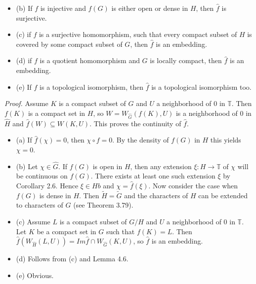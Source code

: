 \documentclass[12pt]{article}
\begin{document}
\begin{itemize}
\begin{itemize}
\begin{itemize}
    \item (b) If $f$ is injective and $f(G)$ is either open or dense in $H$, then $\hat{f}$ is surjective.

    \item (c) if $f$ is a surjective homomorphism, such that every compact subset of $H$ is covered by some compact subset
    of $G$, then $\hat{f}$ is an embedding.

    \item (d) if $f$ is a quotient homomorphism and $G$ is locally compact, then $\hat{f}$ is an embedding.

    \item (e) If $f$ is a topological isomorphism, then $\hat{f}$ is a topological isomorphism too.

\end{itemize}


\emph{Proof.} Assume $K$ is a compact subset of $G$ and $U$ a neighborhood of 0 in $\mathbb{T}$. Then $f(K)$ is a compact set in $H$,
so $W = W_{\hat{G}}(f(K), U)$ is a neighborhood of 0 in $\hat{H}$ and $\hat{f}(W) \subseteq W(K, U)$. This proves the continuity of $\hat{f}$.


\begin{itemize}

    \item (a) If $\hat{f}(\chi) = 0$, then $\chi \circ f = 0$. By the density of $f(G)$ in $H$ this yields $\chi = 0$.

    \item (b) Let $\chi \in \hat{G}$. If $f(G)$ is open in $H$, then any extension $\xi : H \to \mathbb{T}$ of $\chi$ will be continuous on $f(G)$. There
    exists at least one such extension $\xi$ by Corollary 2.6. Hence $\xi \in Hb$ and $\chi = \hat{f}(\xi)$. Now consider the case
    when $f(G)$ is dense in $H$. Then $\tilde{H} = \tilde{G}$ and the characters of $H$ can be extended to characters of $G$ (see
    Theorem 3.79).

    \item (c) Assume $L$ is a compact subset of $G/H$ and $U$ a neighborhood of 0 in $\mathbb{T}$. Let $K$ be a compact set in $G$
    such that $f(K) = L$. Then $\hat{f}(W_{\hat{H}} (L, U)) = Im \hat{f} \cap W_{\hat{G}} (K, U)$, so $\hat{f}$ is an embedding.    

    \item (d) Follows from (c) and Lemma 4.6.

    \item (e) Obvious.


\end{itemize}
\end{itemize}
\end{itemize}
\end{document}
